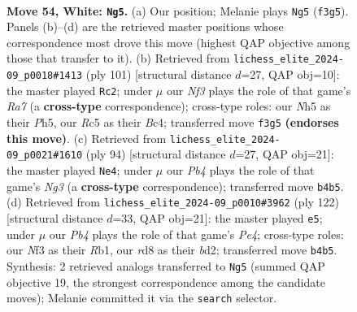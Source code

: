 \documentclass[11pt]{article}
\begin{document}
\clearpage

\begin{figure}[p]\centering
\begin{subfigure}{0.46\textwidth}\centering
\resizebox{\linewidth}{!}{%
\newchessgame
\chessboard[
  setfen={3r4/k7/8/2RB1p1N/1P6/3b1N2/1K4P1/8 w - - 4 54},
  showmover=false,
  pgfstyle=straightmove, color=movearrow, markmove={f3-g5}
]}
\caption{}
\end{subfigure}\hfill
\begin{subfigure}{0.46\textwidth}\centering
\resizebox{\linewidth}{!}{%
\newchessgame
\chessboard[
  setfen={8/4k3/1R6/4Bp1p/2b2P1P/1p6/r7/6K1 b - - 4 51},
  showmover=false,
  pgfstyle=straightmove, color=movearrow, markmove={a2-c2}
]}
\caption{}
\end{subfigure}
\\[4pt]
\begin{subfigure}{0.46\textwidth}\centering
\resizebox{\linewidth}{!}{%
\newchessgame
\chessboard[
  setfen={8/6pk/8/1bB1R3/1P6/6N1/2r5/6K1 w - - 3 48},
  showmover=false,
  pgfstyle=straightmove, color=movearrow, markmove={g3-e4}
]}
\caption{}
\end{subfigure}\hfill
\begin{subfigure}{0.46\textwidth}\centering
\resizebox{\linewidth}{!}{%
\newchessgame
\chessboard[
  setfen={2k5/8/8/r7/p1pBP1K1/2P5/3b4/1R6 w - - 19 62},
  showmover=false,
  pgfstyle=straightmove, color=movearrow, markmove={e4-e5}
]}
\caption{}
\end{subfigure}
\caption{\textbf{Move 54, White: \texttt{Ng5}.} (a) Our position; Melanie plays \texttt{Ng5} (\texttt{f3g5}). Panels (b)--(d) are the retrieved master positions whose correspondence most drove this move (highest QAP objective among those that transfer to it). (b) Retrieved from \texttt{lichess\_elite\_2024-09\_p0018\#1413} (ply 101) [structural distance $d$=27, QAP obj=10]: the master played \texttt{Rc2}; under $\mu$ our \emph{Nf3} plays the role of that game's \emph{Ra7} (a \textbf{cross-type} correspondence); cross-type roles: our \emph{N}h5 as their \emph{P}h5, our \emph{R}c5 as their \emph{B}c4; transferred move \texttt{f3g5} \textbf{(endorses this move)}. (c) Retrieved from \texttt{lichess\_elite\_2024-09\_p0021\#1610} (ply 94) [structural distance $d$=27, QAP obj=21]: the master played \texttt{Ne4}; under $\mu$ our \emph{Pb4} plays the role of that game's \emph{Ng3} (a \textbf{cross-type} correspondence); transferred move \texttt{b4b5}. (d) Retrieved from \texttt{lichess\_elite\_2024-09\_p0010\#3962} (ply 122) [structural distance $d$=33, QAP obj=21]: the master played \texttt{e5}; under $\mu$ our \emph{Pb4} plays the role of that game's \emph{Pe4}; cross-type roles: our \emph{N}f3 as their \emph{R}b1, our \emph{r}d8 as their \emph{b}d2; transferred move \texttt{b4b5}. Synthesis: 2 retrieved analogs transferred to \texttt{Ng5} (summed QAP objective 19, the strongest correspondence among the candidate moves); Melanie committed it via the \texttt{search} selector.}
\label{fig:thought-m106}
\end{figure}
\end{document}

